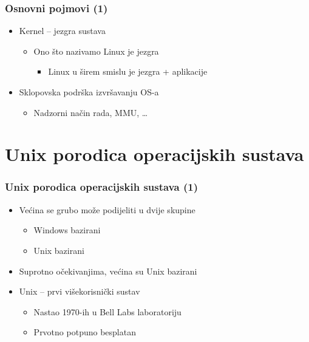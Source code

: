 \documentclass{beamer}
\begin{document}
\begin{frame}[t]
\frametitle{Osnovni pojmovi (1)}
\begin{itemize}
  \item Kernel -- jezgra sustava
  \begin{itemize}
    \item Ono što nazivamo Linux je jezgra
    \begin{itemize}
      \item Linux u širem smislu je jezgra + aplikacije
    \end{itemize}
  \end{itemize}
  \item Sklopovska podrška izvršavanju OS-a
  \begin{itemize}
    \item Nadzorni način rada, MMU, \ldots
  \end{itemize}
\end{itemize}
\end{frame}

\section{Unix porodica operacijskih sustava}
\begin{frame}[t]
\frametitle{Unix porodica operacijskih sustava (1)}
\begin{itemize}
  \item Većina se grubo može podijeliti u dvije skupine
  \begin{itemize}
    \item Windows bazirani
    \item Unix bazirani
  \end{itemize}
  \item Suprotno očekivanjima, većina su Unix bazirani
  \item Unix – prvi višekorisnički sustav
  \begin{itemize}
    \item Nastao 1970-ih u Bell Labs laboratoriju
    \item Prvotno potpuno besplatan
  \end{itemize}
\end{itemize}
\end{frame}
\end{document}
